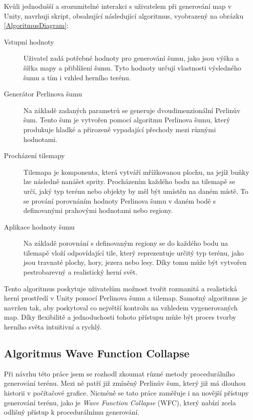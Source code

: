 Kvůli jednodušší a srozumitelné interakci s uživatelem při generování map v Unity, navrhuji skript, obsahující následující algoritmus, vyobrazený na obrázku \ref{AlgoritmusDiagram}:

\begin{description}
	\item[Vstupní hodnoty] Uživatel zadá potřebné hodnoty pro generování šumu, jako jsou výška a šířka mapy a přiblížení šumu. Tyto hodnoty určují vlastnosti výsledného šumu a tím i vzhled herního terénu.
	\item[Generátor Perlinova šumu] Na základě zadaných parametrů se generuje dvoudimenzionální Perlinův šum. Tento šum je vytvořen pomocí algoritmu Perlinova šumu, který produkuje hladké a přirozeně vypadající přechody mezi různými hodnotami.
	\item[Procházení tilemapy] Tilemapa je komponenta, která vytváří mřížkovanou plochu, na jejíž buňky lze následně nanášet sprity. Procházením každého bodu na tilemapě se určí, jaký typ terénu nebo objekty by měl být umístěn na daném místě. To se prování porovnáním hodnoty Perlinova šumu v daném bodě s definovanými prahovými hodnotami nebo regiony.
	\item[Aplikace hodnoty šumu] Na základě porovnání s definovaným regiony se do každého bodu na tilemapě vloží odpovídající tile, který reprezentuje určitý typ terénu, jako jsou travnaté plochy, hory, jezera nebo lesy. Díky tomu může být vytvořen pestrobarevný a realistický herní svět.
\end{description}

Tento algoritmus poskytuje uživatelům možnost tvořit rozmanitá a realistická herní prostředí v Unity pomocí Perlinova šumu a tilemap. Samotný algoritmus je navržen tak, aby poskytoval co největší kontrolu na vzhledem vygenerovaných map. Díky flexibilitě a jednoduchosti tohoto přístupu může být proces tvorby herního světa intuitivní a rychlý. 

\subsection{Algoritmus Wave Function Collapse}
Při návrhu této práce jsem se rozhodl zkoumat různé metody procedurálního generování terénu. Mezi ně patří již zmíněný Perlinův šum, který již má dlouhou historii v počítačové grafice. Nicméně se tato práce zaměřuje i na novější přístupy generování terénu, jako je \textit{Wave Function Collapse} (WFC), který nabízí zcela odlišný přístup k procedurálnímu generování.

